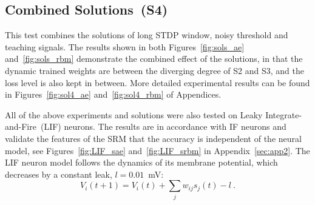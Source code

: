 \subsection{Combined Solutions~(S4)}
This test combines the solutions of long STDP window, noisy threshold and teaching signals.
The results shown in both Figures~\ref{fig:sols_ae} and~\ref{fig:sols_rbm} demonstrate the combined effect of the solutions, in that the dynamic trained weights are between the diverging degree of S2 and S3, and the loss level is also kept in between.
More detailed experimental results can be found in Figures~\ref{fig:sol4_ae} and~\ref{fig:sol4_rbm} of Appendices.

All of the above experiments and solutions were also tested on Leaky Integrate-and-Fire~(LIF) neurons.
The results are in accordance with IF neurons and validate the features of the SRM that the accuracy is independent of the neural model, see Figures~\ref{fig:LIF_sae} and~\ref{fig:LIF_srbm} in Appendix~\ref{sec:app2}.
The LIF neuron model follows the dynamics of its membrane potential, which decreases by a constant leak, $l=0.01$~mV:
\begin{equation}
V_i(t+1)=V_i(t) + \sum_j w_{ij} s_j(t) - l~.
\end{equation}
